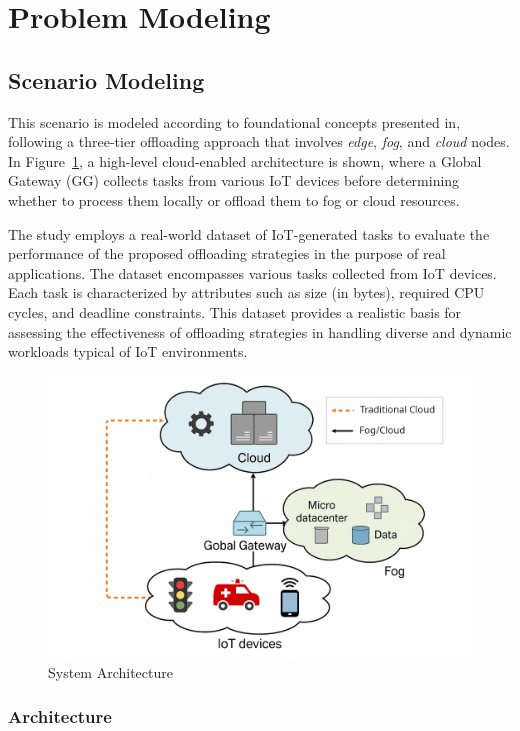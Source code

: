 \documentclass[preprint,3p,authoryear]{elsarticle}
\begin{document}
\section{Problem Modeling}\label{sec:problem_modeling}

\subsection{Scenario Modeling}\label{sec:scenario_modeling}

This scenario is modeled according to foundational concepts presented in\cite{aazam_cloud_2022, bukhari_intelligent_2022, jazayeri_autonomous_2021}, following a three-tier offloading approach that involves \textit{edge}, \textit{fog}, and \textit{cloud} nodes. In Figure~\ref{fig:cloud-architecture}, a high-level cloud-enabled architecture is shown, where a Global Gateway (GG) collects tasks from various IoT devices before determining whether to process them locally or offload them to fog or cloud resources.


The study employs a real-world dataset of IoT-generated tasks to evaluate the performance of the proposed offloading strategies in the purpose of real applications. The dataset encompasses various tasks collected from IoT devices. Each task is characterized by attributes such as size (in bytes), required CPU cycles, and deadline constraints. This dataset provides a realistic basis for assessing the effectiveness of offloading strategies in handling diverse and dynamic workloads typical of IoT environments.

\begin{figure}[ht]
    \centering
    \includegraphics[width=0.75\linewidth]{figs/cloud_architecture.png}
    \caption{System Architecture}\label{fig:cloud-architecture}
\end{figure}


\subsubsection{Architecture}\label{subsec:architecture}
\end{document}
